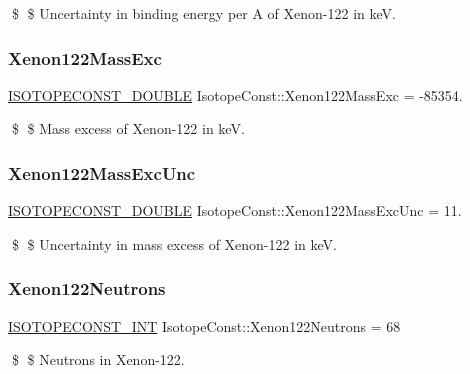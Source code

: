 \$ \$ Uncertainty in binding energy per A of Xenon-\/122 in keV. \mbox{\label{group___isotope_const-_xenon-_xe122_gad9afc20a63c7149858a49a51b3056245}} 
\subsubsection{\texorpdfstring{Xenon122\+Mass\+Exc}{Xenon122MassExc}}
{\footnotesize\ttfamily \mbox{\hyperlink{group___isotope_const-_macros_ga8f45a7272ce02c0b4c65c44636ed719a}{I\+S\+O\+T\+O\+P\+E\+C\+O\+N\+S\+T\+\_\+\+D\+O\+U\+B\+LE}} Isotope\+Const\+::\+Xenon122\+Mass\+Exc = -\/85354.}

\$ \$ Mass excess of Xenon-\/122 in keV. \mbox{\label{group___isotope_const-_xenon-_xe122_ga75884e5b962f3286aebd1469385541ca}} 
\subsubsection{\texorpdfstring{Xenon122\+Mass\+Exc\+Unc}{Xenon122MassExcUnc}}
{\footnotesize\ttfamily \mbox{\hyperlink{group___isotope_const-_macros_ga8f45a7272ce02c0b4c65c44636ed719a}{I\+S\+O\+T\+O\+P\+E\+C\+O\+N\+S\+T\+\_\+\+D\+O\+U\+B\+LE}} Isotope\+Const\+::\+Xenon122\+Mass\+Exc\+Unc = 11.}

\$ \$ Uncertainty in mass excess of Xenon-\/122 in keV. \mbox{\label{group___isotope_const-_xenon-_xe122_gae45d844a71c6b7e9bed7dce47a338781}} 
\subsubsection{\texorpdfstring{Xenon122\+Neutrons}{Xenon122Neutrons}}
{\footnotesize\ttfamily \mbox{\hyperlink{group___isotope_const-_macros_ga5f18360b3e99483a35c32d789e62621c}{I\+S\+O\+T\+O\+P\+E\+C\+O\+N\+S\+T\+\_\+\+I\+NT}} Isotope\+Const\+::\+Xenon122\+Neutrons = 68}

\$ \$ Neutrons in Xenon-\/122. \mbox{\label{group___isotope_const-_xenon-_xe122_gab2b996c7f0d35071b18e841fe5958f21}} 
